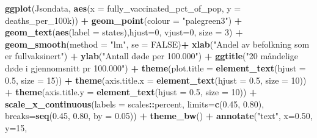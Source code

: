 \documentclass[
]{article}
\newenvironment{Shaded}{\begin{snugshade}}{\end{snugshade}}
\newcommand{\DataTypeTok}[1]{\textcolor[rgb]{0.13,0.29,0.53}{#1}}
\newcommand{\DecValTok}[1]{\textcolor[rgb]{0.00,0.00,0.81}{#1}}
\newcommand{\FloatTok}[1]{\textcolor[rgb]{0.00,0.00,0.81}{#1}}
\newcommand{\KeywordTok}[1]{\textcolor[rgb]{0.13,0.29,0.53}{\textbf{#1}}}
\newcommand{\NormalTok}[1]{#1}
\newcommand{\OperatorTok}[1]{\textcolor[rgb]{0.81,0.36,0.00}{\textbf{#1}}}
\newcommand{\OtherTok}[1]{\textcolor[rgb]{0.56,0.35,0.01}{#1}}
\newcommand{\StringTok}[1]{\textcolor[rgb]{0.31,0.60,0.02}{#1}}
\begin{document}
\begin{Shaded}
\begin{Highlighting}[]
\KeywordTok{ggplot}\NormalTok{(Jsondata, }\KeywordTok{aes}\NormalTok{(}\DataTypeTok{x =}\NormalTok{ fully_vaccinated_pct_of_pop, }\DataTypeTok{y =}\NormalTok{ deaths_per_100k)) }\OperatorTok{+}\StringTok{ }
\StringTok{  }\KeywordTok{geom_point}\NormalTok{(}\DataTypeTok{colour =} \StringTok{"palegreen3"}\NormalTok{) }\OperatorTok{+}\StringTok{ }
\StringTok{  }\KeywordTok{geom_text}\NormalTok{(}\KeywordTok{aes}\NormalTok{(}\DataTypeTok{label =}\NormalTok{ states),}\DataTypeTok{hjust=}\DecValTok{0}\NormalTok{, }\DataTypeTok{vjust=}\DecValTok{0}\NormalTok{, }\DataTypeTok{size =} \DecValTok{3}\NormalTok{) }\OperatorTok{+}
\StringTok{  }\KeywordTok{geom_smooth}\NormalTok{(}\DataTypeTok{method =} \StringTok{"lm"}\NormalTok{, }\DataTypeTok{se =} \OtherTok{FALSE}\NormalTok{)}\OperatorTok{+}
\StringTok{  }\KeywordTok{xlab}\NormalTok{(}\StringTok{"Andel av befolkning som er fullvaksinert"}\NormalTok{) }\OperatorTok{+}\StringTok{ }
\StringTok{  }\KeywordTok{ylab}\NormalTok{(}\StringTok{"Antall døde per 100.000"}\NormalTok{) }\OperatorTok{+}
\StringTok{  }\KeywordTok{ggtitle}\NormalTok{(}\StringTok{"20 måndelige døde i gjennomsnitt pr 100.000"}\NormalTok{) }\OperatorTok{+}\StringTok{ }
\StringTok{  }\KeywordTok{theme}\NormalTok{(}\DataTypeTok{plot.title =} \KeywordTok{element_text}\NormalTok{(}\DataTypeTok{hjust =} \FloatTok{0.5}\NormalTok{, }\DataTypeTok{size =} \DecValTok{15}\NormalTok{)) }\OperatorTok{+}
\StringTok{  }\KeywordTok{theme}\NormalTok{(}\DataTypeTok{axis.title.x =} \KeywordTok{element_text}\NormalTok{(}\DataTypeTok{hjust =} \FloatTok{0.5}\NormalTok{, }\DataTypeTok{size =} \DecValTok{10}\NormalTok{)) }\OperatorTok{+}
\StringTok{  }\KeywordTok{theme}\NormalTok{(}\DataTypeTok{axis.title.y =} \KeywordTok{element_text}\NormalTok{(}\DataTypeTok{hjust =} \FloatTok{0.5}\NormalTok{, }\DataTypeTok{size =} \DecValTok{10}\NormalTok{)) }\OperatorTok{+}
\StringTok{  }\KeywordTok{scale_x_continuous}\NormalTok{(}\DataTypeTok{labels =}\NormalTok{ scales}\OperatorTok{::}\NormalTok{percent, }\DataTypeTok{limits=}\KeywordTok{c}\NormalTok{(}\FloatTok{0.45}\NormalTok{, }\FloatTok{0.80}\NormalTok{), }\DataTypeTok{breaks=}\KeywordTok{seq}\NormalTok{(}\FloatTok{0.45}\NormalTok{, }\FloatTok{0.80}\NormalTok{, }\DataTypeTok{by =} \FloatTok{0.05}\NormalTok{)) }\OperatorTok{+}\StringTok{ }
\StringTok{  }\KeywordTok{theme_bw}\NormalTok{() }\OperatorTok{+}\StringTok{ }
\StringTok{  }\KeywordTok{annotate}\NormalTok{(}\StringTok{"text"}\NormalTok{, }\DataTypeTok{x=}\FloatTok{0.50}\NormalTok{, }\DataTypeTok{y=}\DecValTok{15}\NormalTok{, }

\end{Highlighting}
\end{Shaded}
\end{document}
